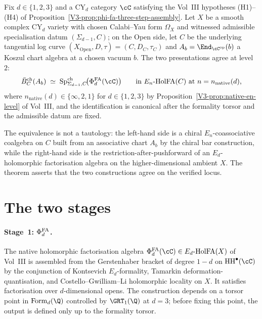 \begin{theorem}
\label{thm:vertical-level-2}
Fix $d\in\{1,2,3\}$ and a CY$_d$ category $\cC$ satisfying the
Vol~III hypotheses (H1)--(H4) of
Proposition~\ref{V3-prop:phi-fa-three-step-assembly}. Let
$X$ be a smooth complex CY$_d$ variety with chosen Calabi--Yau form
$\Omega_X$ and witnessed admissible specialisation datum
$(\Sigma_{d-1},C)$; on the Open side, let $C$ be the underlying
tangential log curve $(X_{\mathrm{Open}},D,\tau)=(C,D_C,\tau_C)$ and
$A_b=\End_{\cC^{\mathrm{op}}}(b)$ a Koszul chart algebra at a
chosen vacuum $b$. The two presentations agree at level~$2$:
\[
 \Bbarch_C(A_b)\;\simeq\;
 \SpCh_{\Sigma_{d-1},C}\!\bigl(\PhiFA_d(\cC)\bigr)
 \qquad
 \text{in $\EnHolFA(C)$ at $n=n_{\mathrm{native}}(d)$,}
\]
where $n_{\mathrm{native}}(d)\in\{\infty,2,1\}$ for $d\in\{1,2,3\}$ by
Proposition~\ref{V3-prop:native-en-level} of Vol~III, and the
identification is canonical after the formality torsor and the
admissible datum are fixed.
\end{theorem}

The equivalence is not a tautology: the left-hand side is a chiral
$E_n$-coassociative coalgebra on $C$ built from an associative chart
$A_b$ by the chiral bar construction, while the right-hand side is the
restriction-after-pushforward of an $E_d$-holomorphic factorisation
algebra on the higher-dimensional ambient $X$. The theorem asserts
that the two constructions agree on the verified locus.

\section{The two stages}
\label{sec:vert-level-2-two-stages}

\paragraph{Stage~1: $\Phi^{\mathrm{FA}}_d$.}
The native holomorphic factorisation algebra
$\PhiFA_d(\cC)\in\EdHolFA(X)$ of Vol~III is assembled
from the Gerstenhaber bracket of degree $1-d$ on $\HH^\bullet(\cC)$ by
the conjunction of Kontsevich $E_d$-formality, Tamarkin
deformation-quantisation, and Costello--Gwilliam--Li holomorphic
locality on $X$. It satisfies factorisation over $d$-dimensional opens.
The construction depends on a torsor point in $\mathrm{Form}_d(\Q)$
controlled by $\GRT_1(\Q)$ at $d=3$; before fixing this point, the
output is defined only up to the formality torsor.

